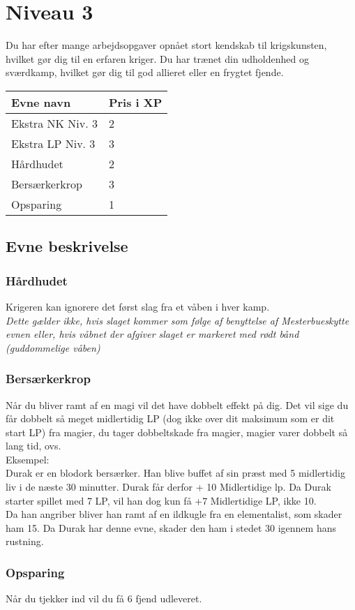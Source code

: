\chapter{Niveau 3}
Du har efter mange arbejdsopgaver opnået stort kendskab til krigskunsten, hvilket gør dig til en erfaren kriger. Du har trænet din udholdenhed og sværdkamp, hvilket gør dig til god allieret eller en frygtet fjende.
\begin{table}[H]
    \centering
    \begin{tabular}{|p{}|p{}|}
    \rowcolor{cerulean!80}\hline
        Evne navn & Pris i XP \\\hline
         Ekstra NK Niv. 3 & 2 \\\hline
         Ekstra LP Niv. 3 & 3 \\\hline
         Hårdhudet & 2\\\hline
         Bersærkerkrop & 3\\\hline
         Opsparing & 1\\
         \hline
    \end{tabular}
\end{table}
\section{Evne beskrivelse}





\subsection{Hårdhudet}
Krigeren kan ignorere det først slag fra et våben i hver kamp.\\
\emph{Dette gælder ikke, hvis slaget kommer som følge af benyttelse af Mesterbueskytte evnen eller, hvis våbnet der afgiver slaget er markeret med rødt bånd (guddommelige våben)}\\

\subsection{Bersærkerkrop}
Når du bliver ramt af en magi vil det have dobbelt effekt på dig. Det vil sige du får dobbelt så meget midlertidig LP (dog ikke over dit maksimum som er dit start LP) fra magier, du tager dobbeltskade fra magier, magier varer dobbelt så lang tid, ovs.\\
Eksempel:\\
Durak er en blodork bersærker. Han blive buffet af sin præst med 5 midlertidig liv i de næste 30 minutter. Durak får derfor + 10 Midlertidige lp. Da Durak starter spillet med 7 LP, vil han dog kun få +7 Midlertidige LP, ikke 10. \\
Da han angriber bliver han ramt af en ildkugle fra en elementalist, som skader ham 15. Da Durak har denne evne, skader den ham i stedet 30 igennem hans rustning.\\

\subsection{Opsparing}
Når du tjekker ind vil du få 6 fjend udleveret.